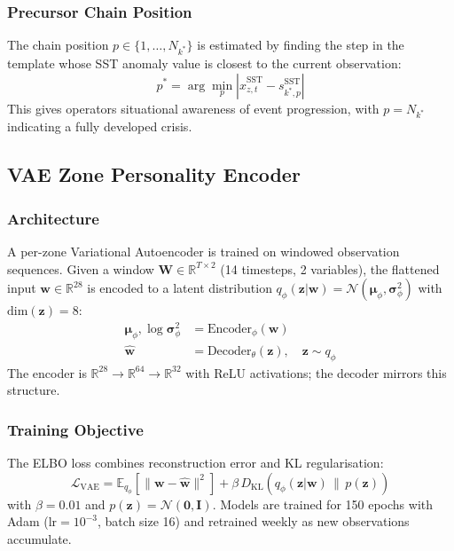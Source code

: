 \documentclass[journal]{IEEEtran}
\begin{document}
\subsubsection{Precursor Chain Position}

The chain position $p \in \{1,\ldots,N_{k^*}\}$ is estimated by
finding the step in the template whose SST anomaly value is closest
to the current observation:
\begin{equation}
p^* = \arg\min_p \left|\hat{x}_{z,t}^{\text{SST}} - s_{k^*,p}^{\text{SST}}\right|
\label{eq:chain}
\end{equation}
This gives operators situational awareness of event progression, with
$p = N_{k^*}$ indicating a fully developed crisis.

\subsection{VAE Zone Personality Encoder}
\label{subsec:vae}

\subsubsection{Architecture}

A per-zone Variational Autoencoder \cite{kingma2014} is trained on
windowed observation sequences. Given a window
$\mathbf{W} \in \mathbb{R}^{T \times 2}$ (14 timesteps, 2 variables),
the flattened input $\mathbf{w} \in \mathbb{R}^{28}$ is encoded to a
latent distribution $q_\phi(\mathbf{z}|\mathbf{w}) = \mathcal{N}(\bm{\mu}_\phi, \bm{\sigma}^2_\phi)$
with $\text{dim}(\mathbf{z}) = 8$:
\begin{align}
\bm{\mu}_\phi, \log\bm{\sigma}^2_\phi &= \text{Encoder}_\phi(\mathbf{w})\\
\hat{\mathbf{w}} &= \text{Decoder}_\theta(\mathbf{z}),
\quad \mathbf{z} \sim q_\phi
\end{align}
The encoder is $\mathbb{R}^{28} \to \mathbb{R}^{64} \to \mathbb{R}^{32}$
with ReLU activations; the decoder mirrors this structure.

\subsubsection{Training Objective}

The ELBO loss combines reconstruction error and KL regularisation:
\begin{equation}
\mathcal{L}_{\text{VAE}} = \mathbb{E}_{q_\phi}\!\left[
  \|\mathbf{w} - \hat{\mathbf{w}}\|^2
\right]
+ \beta\,D_{\text{KL}}\!\left(q_\phi(\mathbf{z}|\mathbf{w})\,\|\,p(\mathbf{z})\right)
\label{eq:vae_loss}
\end{equation}
with $\beta = 0.01$ and $p(\mathbf{z}) = \mathcal{N}(\mathbf{0}, \mathbf{I})$.
Models are trained for 150 epochs with Adam ($\text{lr}=10^{-3}$,
batch size 16) and retrained weekly as new observations accumulate.
\end{document}
